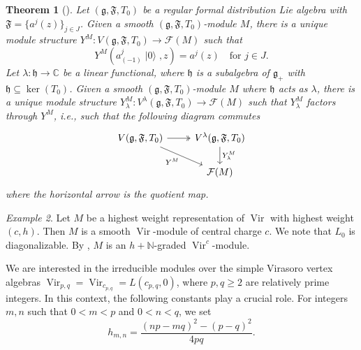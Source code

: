 \documentclass[a4paper, 12pt, reqno]{amsart}
\newtheorem{theorem}{Theorem}[section]
\theoremstyle{remark}
\newtheorem{example}[theorem]{Example}
\DeclareMathOperator{\Vir}{Vir}
\DeclareMathOperator{\vac}{|0\rangle}
\begin{document}
\begin{theorem}[{\cite[Theorem 2.15]{li_vertex_2004}}]
  \label{thr:8}
  Let $(\mathfrak{g}, \mathfrak{F}, T_0)$ be a regular formal distribution Lie algebra with $\mathfrak{F} = \{a^j(z)\}_{j \in J}$.
  Given a smooth $(\mathfrak{g}, \mathfrak{F}, T_0)$-module $M$, there is a unique module structure $Y^M: V(\mathfrak{g}, \mathfrak{F}, T_0) \to \mathcal{F}(M)$ such that
  \begin{equation*}
    Y^M(a^j_{(-1)}\vac, z) = a^j(z) \quad \text{for $j \in J$}.
  \end{equation*}
  Let $\lambda: \mathfrak{h} \to \mathbb{C}$ be a linear functional, where $\mathfrak{h}$ is a subalgebra of $\mathfrak{g}_+$ with $\mathfrak{h} \subseteq \ker(T_0)$.
  Given a smooth $(\mathfrak{g}, \mathfrak{F}, T_0)$-module $M$ where $\mathfrak{h}$ acts as $\lambda$, there is a unique module structure $Y^M_{\lambda}: V^{\lambda}(\mathfrak{g}, \mathfrak{F}, T_0) \to \mathcal{F}(M)$ such that $Y^M_{\lambda}$ factors through $Y^M$, i.e., such that the following diagram commutes
  \begin{equation*}
    \begin{tikzcd}
      V(\mathfrak{g}, \mathfrak{F}, T_0) \arrow[r, two heads] \arrow[rd, "{Y^M}"'] & {V^{\lambda}(\mathfrak{g}, \mathfrak{F}, T_0)} \arrow[d, "{Y^M_{\lambda}}"] \\
      & {\mathcal{F}(M)}
    \end{tikzcd}
  \end{equation*}
  where the horizontal arrow is the quotient map.
\end{theorem}

\begin{example}
  \label{exa:13}
  Let $M$ be a highest weight representation of $\Vir$ with highest weight $(c, h)$.
  Then $M$ is a smooth $\Vir$-module of central charge $c$.
  We note that $L_0$ is diagonalizable.
  By , $M$ is an $h + \mathbb{N}$-graded $\Vir^c$-module.
\end{example}

We are interested in the irreducible modules over the simple Virasoro vertex algebras $\Vir_{p, q} = \Vir_{c_{p, q}} = L(c_{p, q}, 0)$, where $p, q \ge 2$ are relatively prime integers.
In this context, the following constants play a crucial role.
For integers $m, n$ such that $0 < m < p$ and $0 < n < q$, we set
\begin{equation*}
  h_{m, n} = \frac{(np - mq)^2 - (p - q)^2}{4pq}.
\end{equation*}
\end{document}
